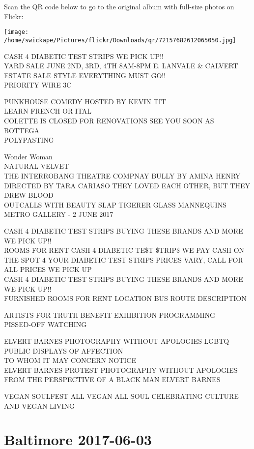 \documentclass[10pt,letterpaper]{article}
\begin{document}
Scan the QR code below to go to the original album with full-size photos on Flickr:

\texttt{[image: /home/swickape/Pictures/flickr/Downloads/qr/72157682612065050.jpg]}
\pagebreak

CASH 4 DIABETIC TEST STRIPS WE PICK UP!!\\
YARD SALE JUNE 2ND, 3RD, 4TH 8AM{-}8PM E. LANVALE \& CALVERT ESTATE SALE STYLE EVERYTHING MUST GO!!\\
PRIORITY WIRE 3C

PUNKHOUSE COMEDY HOSTED BY KEVIN TIT\\
LEARN FRENCH OR ITAL\\
COLETTE IS CLOSED FOR RENOVATIONS SEE YOU SOON AS BOTTEGA\\
POLYPASTING

Wonder Woman\\
NATURAL VELVET\\
THE INTERROBANG THEATRE COMPNAY BULLY BY AMINA HENRY DIRECTED BY TARA CARIASO THEY LOVED EACH OTHER, BUT THEY DREW BLOOD\\
OUTCALLS WITH BEAUTY SLAP TIGERER GLASS MANNEQUINS METRO GALLERY {-} 2 JUNE 2017

CASH 4 DIABETIC TEST STRIPS BUYING THESE BRANDS AND MORE WE PICK UP!!\\
ROOMS FOR RENT CASH 4 DIABETIC TE\$T \$TRIP\$ WE PAY CASH ON THE SPOT 4 YOUR DIABETIC TEST STRIPS PRICES VARY, CALL FOR ALL PRICES WE PICK UP\\
CASH 4 DIABETIC TEST STRIPS BUYING THESE BRANDS AND MORE WE PICK UP!!\\
FURNISHED ROOMS FOR RENT LOCATION BUS ROUTE DESCRIPTION

ARTISTS FOR TRUTH BENEFIT EXHIBITION PROGRAMMING\\
PISSED{-}OFF WATCHING

ELVERT BARNES PHOTOGRAPHY WITHOUT APOLOGIES LGBTQ PUBLIC DISPLAYS OF AFFECTION\\
TO WHOM IT MAY CONCERN NOTICE\\
ELVERT BARNES PROTEST PHOTOGRAPHY WITHOUT APOLOGIES FROM THE PERSPECTIVE OF A BLACK MAN ELVERT BARNES

VEGAN SOULFEST ALL VEGAN ALL SOUL CELEBRATING CULTURE AND VEGAN LIVING
\pagebreak

\section*{Baltimore 2017-06-03}
\end{document}
